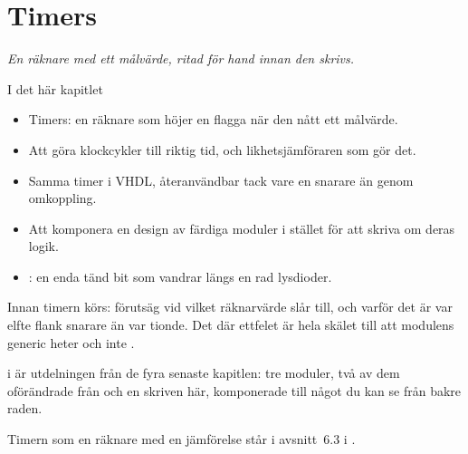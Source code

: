
\chapter{Timers}
\label{c7:ch}

{\large\itshape En räknare med ett målvärde, ritad för hand innan den skrivs.\par}

\begin{chapterbox}{I det här kapitlet}
\begin{itemize}
  \item Timers: en räknare som höjer en flagga när den nått ett målvärde.
  \item Att göra klockcykler till riktig tid, och likhetsjämföraren som gör det.
  \item Samma timer i VHDL, återanvändbar tack vare en  snarare än genom omkoppling.
  \item Att komponera en design av färdiga moduler i stället för att skriva om deras logik.
  \item {}: en enda tänd bit som vandrar längs en rad lysdioder.
\end{itemize}
\end{chapterbox}

Innan timern körs: förutsäg vid vilket räknarvärde  slår till, och varför det är var
elfte flank snarare än var tionde. Det där ettfelet är hela skälet till att modulens generic heter
 och inte .

 i  är utdelningen från de fyra senaste kapitlen: tre
moduler, två av dem oförändrade från  och en skriven här, komponerade till något du
kan se från bakre raden.

\note[Repetition] Timern som en räknare med en jämförelse står i avsnitt~6.3 i \debook{}.




